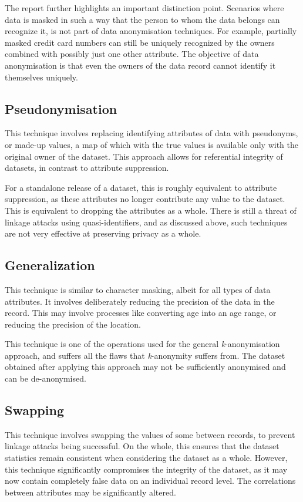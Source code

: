 \documentclass[11pt, a4paper]{article}
\begin{document}
The report further highlights an important distinction point. Scenarios where data is masked in such a way that the person to whom the data belongs can recognize it, is not part of data anonymisation techniques. For example, partially masked credit card numbers can still be uniquely recognized by the owners combined with possibly just one other attribute. The objective of data anonymisation is that even the owners of the data record cannot identify it themselves uniquely.

\subsection{Pseudonymisation}

This technique involves replacing identifying attributes of data with pseudonyms, or made-up values, a map of which with the true values is available only with the original owner of the dataset. This approach allows for referential integrity of datasets, in contrast to attribute suppression.

For a standalone release of a dataset, this is roughly equivalent to attribute suppression, as these attributes no longer contribute any value to the dataset. This is equivalent to dropping the attributes as a whole. There is still a threat of linkage attacks using quasi-identifiers, and as discussed above, such techniques are not very effective at preserving privacy as a whole.

\subsection{Generalization}

This technique is similar to character masking, albeit for all types of data attributes. It involves deliberately reducing the precision of the data in the record. This may involve processes like converting age into an age range, or reducing the precision of the location.

This technique is one of the operations used for the general \textit{k}-anonymisation approach, and suffers all the flaws that \textit{k}-anonymity suffers from. The dataset obtained after applying this approach may not be sufficiently anonymised and can be de-anonymised.

\subsection{Swapping}

This technique involves swapping the values of some between records, to prevent linkage attacks being successful. On the whole, this ensures that the dataset statistics remain consistent when considering the dataset as a whole. However, this technique significantly compromises the integrity of the dataset, as it may now contain completely false data on an individual record level. The correlations between attributes may be significantly altered.
\end{document}
